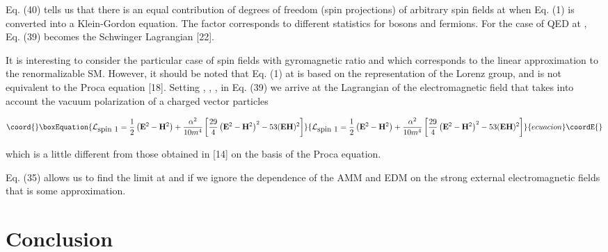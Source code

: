 \documentclass[a4paper,12pt]{article}
\begin{document}
Eq. (40) tells us that there is an equal contribution of \coordHE{} degrees of
freedom (spin projections) of arbitrary spin fields at \coordHE{} when
Eq. (1) is converted into a Klein-Gordon equation. The factor \myHighlight{$\epsilon$}\coordHE{}
corresponds to different statistics for bosons and fermions. For the case of
QED at \coordHE{}  \coordHE{}, \coordHE{} Eq. (39) becomes the Schwinger
Lagrangian [22].

It is interesting to consider the particular case of spin \coordHE{} fields with
gyromagnetic ratio \coordHE{} and \coordHE{} which corresponds to the linear
approximation to the renormalizable SM. However, it should be noted that Eq.
(1) at \coordHE{} is based on the \coordHE{}
representation of the Lorenz group, and is not equivalent to the Proca
equation [18]. Setting \coordHE{}, \coordHE{}, \coordHE{}, \coordHE{} in Eq. (39)
we arrive at the Lagrangian of the electromagnetic field that takes into
account the vacuum polarization of a charged vector particles

\begin{equation}\coord{}\boxEquation{
\mathcal{L}_{\mbox{spin 1}}=\frac 12\left(
\mathbf{E}^2-\mathbf{H}^2\right)+ \frac{\alpha ^2}{10m^4}\left[
\frac{29}4\left( \mathbf{E}^2-\mathbf{H} ^2\right)
^2-53(\mathbf{EH})^2\right]  \label{42}
}{
\mathcal{L}_{\mbox{spin 1}}=\frac 12\left(
\mathbf{E}^2-\mathbf{H}^2\right)+ \frac{\alpha ^2}{10m^4}\left[
\frac{29}4\left( \mathbf{E}^2-\mathbf{H} ^2\right)
^2-53(\mathbf{EH})^2\right]  }{ecuacion}\coordE{}\end{equation}

which is a little different from those obtained in [14] on the basis of the
Proca equation.

Eq. (35) allows us to find the limit at \coordHE{} and
\coordHE{} if we ignore the dependence of the AMM and EDM on
the strong external electromagnetic fields that is some approximation.

\section{Conclusion}
\end{document}

